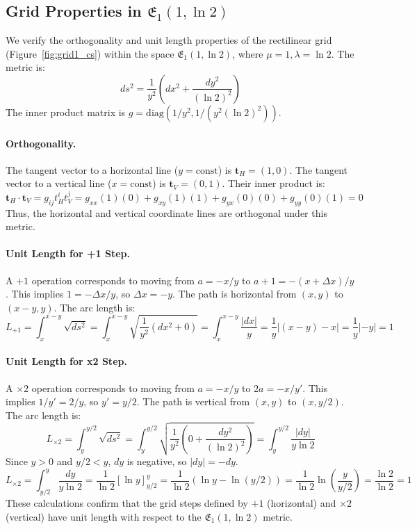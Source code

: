 \documentclass[12pt]{article}
\begin{document}
\subsection{Grid Properties in \( \mathfrak{E}_1(1, \ln 2) \)}
\label{app:grid_properties}

We verify the orthogonality and unit length properties of the rectilinear grid (Figure~\ref{fig:grid1_cs}) within the space \( \mathfrak{E}_1(1, \ln 2) \), where \( \mu=1, \lambda=\ln 2 \). The metric is:
\[
ds^2 = \frac{1}{y^2}\left(dx^2 + \frac{dy^2}{(\ln 2)^2}\right)
\]
The inner product matrix is \( g = \text{diag}(1/y^2, 1/(y^2 (\ln 2)^2)) \).

\paragraph{Orthogonality.}
The tangent vector to a horizontal line (\(y=\text{const}\)) is \( \mathbf{t}_H = (1, 0) \).
The tangent vector to a vertical line (\(x=\text{const}\)) is \( \mathbf{t}_V = (0, 1) \).
Their inner product is:
\[
\mathbf{t}_H \cdot \mathbf{t}_V = g_{ij} t_H^i t_V^j = g_{xx}(1)(0) + g_{xy}(1)(1) + g_{yx}(0)(0) + g_{yy}(0)(1) = 0
\]
Thus, the horizontal and vertical coordinate lines are orthogonal under this metric.

\paragraph{Unit Length for +1 Step.}
A \( +1 \) operation corresponds to moving from \( a = -x/y \) to \( a+1 = -(x+\Delta x)/y \). This implies \( 1 = -\Delta x / y \), so \( \Delta x = -y \). The path is horizontal from \( (x, y) \) to \( (x-y, y) \). The arc length is:
\[
L_{+1} = \int_{x}^{x-y} \sqrt{ds^2} = \int_{x}^{x-y} \sqrt{\frac{1}{y^2}(dx^2 + 0)} = \int_{x}^{x-y} \frac{|dx|}{y} = \frac{1}{y} |(x-y) - x| = \frac{1}{y} |-y| = 1
\]

\paragraph{Unit Length for x2 Step.}
A \( \times 2 \) operation corresponds to moving from \( a = -x/y \) to \( 2a = -x/y' \). This implies \( 1/y' = 2/y \), so \( y' = y/2 \). The path is vertical from \( (x, y) \) to \( (x, y/2) \). The arc length is:
\[
L_{\times 2} = \int_{y}^{y/2} \sqrt{ds^2} = \int_{y}^{y/2} \sqrt{\frac{1}{y^2}(0 + \frac{dy^2}{(\ln 2)^2})} = \int_{y}^{y/2} \frac{|dy|}{y \ln 2}
\]
Since \( y > 0 \) and \( y/2 < y \), \( dy \) is negative, so \( |dy| = -dy \).
\[
L_{\times 2} = \int_{y/2}^{y} \frac{dy}{y \ln 2} = \frac{1}{\ln 2} [\ln y]_{y/2}^y = \frac{1}{\ln 2} (\ln y - \ln(y/2)) = \frac{1}{\ln 2} \ln\left(\frac{y}{y/2}\right) = \frac{\ln 2}{\ln 2} = 1
\]
These calculations confirm that the grid steps defined by \( +1 \) (horizontal) and \( \times 2 \) (vertical) have unit length with respect to the \( \mathfrak{E}_1(1, \ln 2) \) metric.
\end{document}
